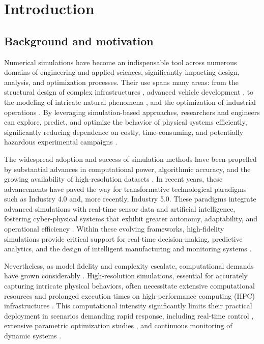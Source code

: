 \chapter{Introduction}

\section{Background and motivation}


Numerical simulations have become an indispensable tool across numerous domains of engineering and applied sciences, significantly impacting design, analysis, and optimization processes. Their use spans many areas: from the structural design of complex infrastructures \cite{carrera2014finite, ranzi2018structural}, advanced vehicle development \cite{stork2008towards}, to the modeling of intricate natural phenomena \cite{gingold1977smoothed}, and the optimization of industrial operations \cite{kiran2020numerical,davidson2003role}. By leveraging simulation-based approaches, researchers and engineers can explore, predict, and optimize the behavior of physical systems efficiently, significantly reducing dependence on costly, time-consuming, and potentially hazardous experimental campaigns \cite{belytschko2014nonlinear,zienkiewicz2005finite}.

The widespread adoption and success of simulation methods have been propelled by substantial advances in computational power, algorithmic accuracy, and the growing availability of high-resolution datasets \cite{Gunal2019Industry, Rodic2017Industry}. In recent years, these advancements have paved the way for transformative technological paradigms such as Industry 4.0 and, more recently, Industry 5.0. These paradigms integrate advanced simulations with real-time sensor data and artificial intelligence, fostering cyber-physical systems that exhibit greater autonomy, adaptability, and operational efficiency \cite{Agostino2020Using, Onggo2018SYMBIOTIC, Catelani2021From}. Within these evolving frameworks, high-fidelity simulations provide critical support for real-time decision-making, predictive analytics, and the design of intelligent manufacturing and monitoring systems \cite{Sandberg2019Current, Muhammet2021Industry, Muhuri2019Industry}.

Nevertheless, as model fidelity and complexity escalate, computational demands have grown considerably \cite{elmisaoui2023high}. High-resolution simulations, essential for accurately capturing intricate physical behaviors, often necessitate extensive computational resources and prolonged execution times on high-performance computing (HPC) infrastructures \cite{hosseini2016direct}. This computational intensity significantly limits their practical deployment in scenarios demanding rapid response, including real-time control \cite{ra2023real, ballin1988high}, extensive parametric optimization studies \cite{breitkopf2013multidisciplinary}, and continuous monitoring of dynamic systems \cite{dyskin2018computational}.

